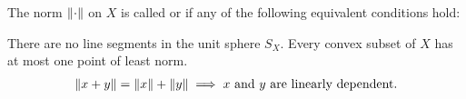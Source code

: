 \begin{definition}\label{def:rotund_norm}\cite[definition 2.36]{Phelps1993}
  The norm \( \left\Vert \cdot \right\Vert \) on \( X \) is called  or  if any of the following equivalent conditions hold:
  \begin{defenum}
     There are no line segments in the unit sphere \( S_X \).
     Every convex subset of \( X \) has at most one point of least norm.
    \begin{align}\label{def:rotund_norm/linearly_dependent/equation}
      \left\Vert x + y \right\Vert = \left\Vert x \right\Vert + \left\Vert y \right\Vert \implies x \text{ and } y \text{ are linearly dependent}.
    \end{align}
  \end{defenum}
\end{definition}
